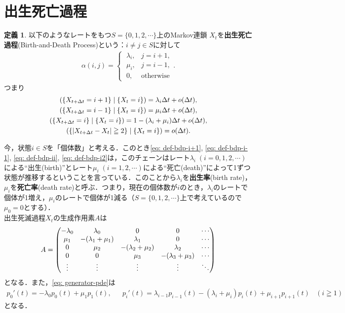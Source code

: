 \documentclass[dvipdfmx]{jsarticle}
\numberwithin{equation}{section}
\theoremstyle{definition}
\newtheorem{dfn}[thm]{定義}
\let\P\relax
\newcommand{\P}{\mathbb{P}}
\newcommand{\0}{\bm{0}}
\newcommand{\1}{\bm{1}}
\newcommand{\dt}{\Delta t}
\begin{document}
\section{出生死亡過程}
\begin{dfn}
  以下のようなレートをもつ$S = \{0,1,2, \cdots \}$上のMarkov連鎖 $X_t$を{\bf 出生死亡過程}(Birth-and-Death Process)という：$i \ne j \in S$に対して
  \begin{align}
    \alpha(i,j) = \begin{cases} 
      \; \lambda_i, & j = i+1, \\ 
      \; \mu_i, & j = i-1, \\
      \; 0, & \text{otherwise}
    \end{cases}.
  \end{align}
  つまり
  \begin{gather}
    \P( \{X_{t + \dt} = i+1\} \mid \{X_t = i\} ) = \lambda_i \dt + o(\dt), \label{eq: def-bdp-i+1} \\
    \P( \{X_{t + \dt} = i-1\} \mid \{X_t = i\} ) = \mu_i \dt + o(\dt), \label{eq: def-bdp-i-1} \\
    \P( \{X_{t + \dt} = i\} \mid \{X_t = i\} ) = 1 - (\lambda_i + \mu_i) \dt + o(\dt), \label{eq: def-bdp-ii} \\
    \P( \{|X_{t + \dt} - X_t| \geqq 2\} \mid \{X_t = i\} ) = o(\dt). \label{eq: def-bdp-i2}
  \end{gather}
\end{dfn}

今，状態$i\in S$を「個体数」と考える．このとき\eqref{eq: def-bdp-i+1}, \eqref{eq: def-bdp-i-1}, \eqref{eq: def-bdp-ii}, \eqref{eq: def-bdp-i2}は，このチェーンはレート$\lambda_i \; (i = 0,1,2, \cdots)$による“出生(birth)”とレート$\mu_i \; (i = 1,2, \cdots)$による“死亡(death)”によって1ずつ状態が推移するということを言っている．このことから$\lambda_i$を{\bf 出生率}(birth rate)，$\mu_i$を{\bf 死亡率}(death rate)と呼ぶ．つまり，現在の個体数が$i$のとき，$\lambda_i$のレートで個体が1増え，$\mu_i$のレートで個体が1減る（$S = \{0,1,2, \cdots\}$上で考えているので$\mu_0 = 0$とする）．\\

出生死滅過程$X_t$の生成作用素$A$は
\begin{align}
  A = \mqty(
    -\lambda_0 & \lambda_0 & 0 & 0 & \cdots \\
    \mu_1 & -(\lambda_1 + \mu_1) & \lambda_1 & 0 & \cdots \\
    0 & \mu_2 & -(\lambda_2 + \mu_2) & \lambda_2 & \cdots \\
    0 & 0 & \mu_3 & -(\lambda_3 + \mu_3) & \cdots \\
    \vdots & \vdots & \vdots & \vdots & \ddots )
\end{align}
となる．また，\eqref{eq: generator-pde}は
\begin{align}
  p_0'(t) = -\lambda_0 p_0(t) + \mu_1 p_1(t), && 
  p_i'(t) = \lambda_{i-1} p_{i-1}(t) -(\lambda_i + \mu_i) p_i(t) + \mu_{i+1} p_{i+1}(t) ~~~~ (i\geqq1)
\end{align}
となる．
\end{document}
